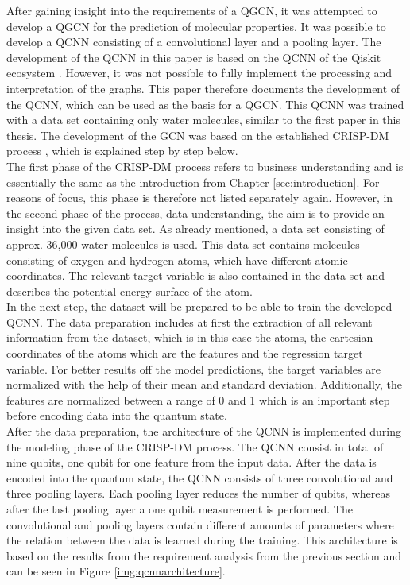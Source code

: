 After gaining insight into the requirements of a QGCN, it was attempted to develop a QGCN for the prediction of molecular properties. It was possible to develop a QCNN consisting of a convolutional layer and a pooling layer. The development of the QCNN in this paper is based on the QCNN of the Qiskit ecosystem \cite{qcnn}. However, it was not possible to fully implement the processing and interpretation of the graphs. This paper therefore documents the development of the QCNN, which can be used as the basis for a QGCN. This QCNN was trained with a data set containing only water molecules, similar to the first paper in this thesis. The development of the GCN was based on the established CRISP-DM process \cite{wirth2000crisp}, which is explained step by step below. \\

The first phase of the CRISP-DM process refers to business understanding and is essentially the same as the introduction from Chapter \ref{sec:introduction}. For reasons of focus, this phase is therefore not listed separately again. However, in the second phase of the process, data understanding, the aim is to provide an insight into the given data set. As already mentioned, a data set consisting of approx. 36,000 water molecules is used.  This data set contains molecules consisting of oxygen and hydrogen atoms, which have different atomic coordinates. The relevant target variable is also contained in the data set and describes the potential energy surface of the atom. \\

In the next step, the dataset will be prepared to be able to train the developed QCNN. The data preparation includes at first the extraction of all relevant information from the dataset, which is in this case the atoms, the cartesian coordinates of the atoms which are the features and the regression target variable. For better results off the model predictions, the target variables are normalized with the help of their mean and standard deviation. Additionally, the features are normalized between a range of 0 and 1 which is an important step before encoding data into the quantum state. \\

After the data preparation, the architecture of the QCNN is implemented during the modeling phase of the CRISP-DM process. The QCNN consist in total of nine qubits, one qubit for one feature from the input data. After the data is encoded into the quantum state, the QCNN consists of three convolutional and three pooling layers. Each pooling layer reduces the number of qubits, whereas after the last pooling layer a one qubit measurement is performed. The convolutional and pooling layers contain different amounts of parameters where the relation between the data is learned during the training. This architecture is based on the results from the requirement analysis from the previous section and can be seen in Figure \ref{img:qcnnarchitecture}. \\

